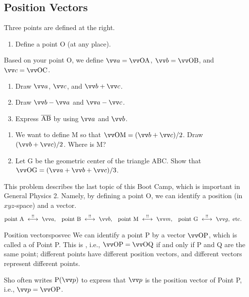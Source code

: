 \documentclass[11pt,pdfa,lastpage]{MishoNote}
\begin{document}
\newpage
\subsection{Position Vectors}
\begin{problems}
  \Problem[S] Three points are defined at the right.\par
  \noindent\begin{minipage}[b]{0.55\textwidth}
    \begin{enumerate}
      \item Define a point O (at any place).
    \end{enumerate}
    Based on your point O, we define $\vc a=\vvv{OA}$, $\vc{b}=\vvv{OB}$, and $\vc{c}=\vvv{OC}$.
    \begin{enumerate}[resume]
      \item Draw $\vc a$, $\vc c$, and $\vc b+\vc c$.
      \item Draw $\vc b-\vc a$ and $\vc a-\vc c$.
      \item Express $\overline{\mathrm{AB}}$ by using $\vc a$ and $\vc b$.
    \end{enumerate}
  \end{minipage}
    \begin{minipage}[b]{0.35\textwidth}
    \vspace{-1.5em}\par
    \hfill\usebox{\VectorSetB}
    \par\vspace{1em}
  \end{minipage}
\begin{enumerate}[start=5]
  \item We want to define M so that $\vvv{OM}=(\vc b+\vc c)/2$. Draw $(\vc b+\vc c)/2$. Where is M?
  \item Let G be the geometric center of the triangle ABC. Show that $\vvv{OG}=(\vc a+\vc b+\vc c)/3$.
\end{enumerate}
\end{problems}
\noindent
This problem describes the last topic of this Boot Camp, which is important in General Physics 2.
Namely, by defining a point O, we can identify a position (in $xyz$-space) and a vector.
\begin{align*}
&\text{point A}\idrel \vc a,&
&\text{point B}\idrel \vc b,&
&\text{point M}\idrel \vc m,&
&\text{point G}\idrel \vc g, \text{~etc.}
\end{align*}
\begin{definition}{Position vectors}{posvec}
  We can identify a point P by a vector $\vvv{OP}$, which is called a  of Point P.
  This is , i.e., $\vvv{OP}=\vvv{OQ}$ if and only if P and Q are the same point; different points have different position vectors, and different vectors represent different points.
\end{definition}
Sho often writes $\posvec Pp$ to express that $\vc p$ is the position vector of Point P, i.e., $\vc p=\vvv{OP}$.
\end{document}
